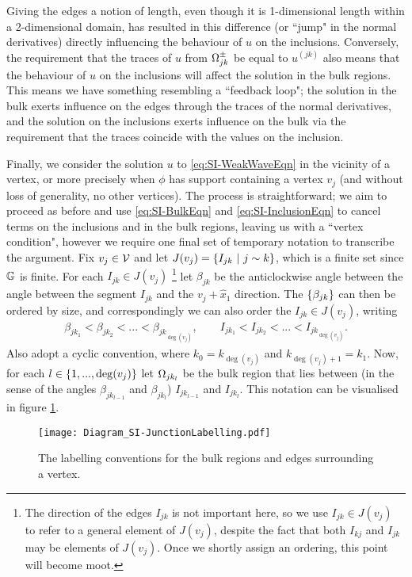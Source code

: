 Giving the edges a notion of length, even though it is 1-dimensional length within a 2-dimensional domain, has resulted in this difference (or ``jump" in the normal derivatives) directly influencing the behaviour of $u$ on the inclusions.
Conversely, the requirement that the traces of $u$ from $\Omega_{jk}^{\pm}$ be equal to $u^{(jk)}$ also means that the behaviour of $u$ on the inclusions will affect the solution in the bulk regions.
This means we have something resembling a ``feedback loop"; the solution in the bulk exerts influence on the edges through the traces of the normal derivatives, and the solution on the inclusions exerts influence on the bulk via the requirement that the traces coincide with the values on the inclusion.

Finally, we consider the solution $u$ to \eqref{eq:SI-WeakWaveEqn} in the vicinity of a vertex, or more precisely when $\phi$ has support containing a vertex $v_j$ (and without loss of generality, no other vertices).
The process is straightforward; we aim to proceed as before and use \eqref{eq:SI-BulkEqn} and \eqref{eq:SI-InclusionEqn} to cancel terms on the inclusions and in the bulk regions, leaving us with a ``vertex condition", however we require one final set of temporary notation to transcribe the argument.
Fix $v_j\in\mathcal{V}$ and let $J(v_j) = \left\{ I_{jk} \ \middle\vert \  j\sim k \right\}$, which is a finite set since $\mathbb{G}$ is finite.
For each $I_{jk}\in J(v_j)$
\footnote{The direction of the edges $I_{jk}$ is not important here, so we use  $I_{jk}\in J(v_j)$ to refer to a general element of $J(v_j)$, despite the fact that both $I_{kj}$ and $I_{jk}$ may be elements of $J(v_j)$. 
Once we shortly assign an ordering, this point will become moot.} 
let $\beta_{jk}$ be the anticlockwise angle between the angle between the segment $I_{jk}$ and the $v_j+\hat{x}_1$ direction.
The $\left\{ \beta_{jk} \right\}$ can then be ordered by size, and correspondingly we can also order the $I_{jk}\in J(v_j)$, writing
\begin{align*}
	\beta_{jk_1} < \beta_{jk_2} < ... < \beta_{jk_{\deg(v_j)}}, 
	\qquad I_{jk_1} < I_{jk_2} < ... < I_{jk_{\deg(v_j)}}.
\end{align*}
Also adopt a cyclic convention, where $k_0 = k_{\deg(v_j)}$ and $k_{\deg(v_j)+1} = k_1$.
Now, for each $l\in\left\{ 1,...,\deg(v_j) \right\}$ let $\Omega_{jk_l}$ be the bulk region that lies between (in the sense of the angles $\beta_{jk_{l-1}}$ and $\beta_{jk_l}$) $I_{jk_{l-1}}$ and $I_{jk_l}$.
This notation can be visualised in figure \ref{fig:Diagram_SI-JunctionLabelling}.
\begin{figure}[h]
	\centering
	\texttt{[image: Diagram\_SI-JunctionLabelling.pdf]}
	\caption{\label{fig:Diagram_SI-JunctionLabelling} The labelling conventions for the bulk regions and edges surrounding a vertex.}
\end{figure}


